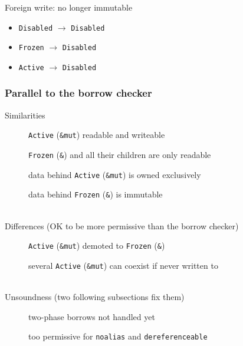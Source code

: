 \begin{frame}[t]
\begin{onlyenv}
        \begin{block}{Foreign write: no longer immutable}
            \begin{itemize}
                \item \texttt{Disabled} \(\to\) \texttt{Disabled}
                \item \texttt{Frozen} \(\to\) \texttt{Disabled}
                \item \texttt{Active} \(\to\) \texttt{Disabled}
            \end{itemize}
        \end{block}
    \end{onlyenv}
\end{frame}

\begin{frame}
    \frametitle{Parallel to the borrow checker}
    Similarities
    \hspace{-5em}
    \begin{description}
        \item[\cmark] \texttt{Active} (\texttt{\&mut}) readable and writeable
        \item[\cmark] \texttt{Frozen} (\texttt{\&}) and all their children are only readable
        \item[\cmark] data behind \texttt{Active} (\texttt{\&mut}) is owned exclusively
        \item[\cmark] data behind \texttt{Frozen} (\texttt{\&}) is immutable
    \end{description}~\\

    Differences (OK to be more permissive than the borrow checker)
    \hspace{-5em}
    \begin{description}
        \item[\xmark] \texttt{Active} (\texttt{\&mut}) demoted to \texttt{Frozen} (\texttt{\&})
        \item[\xmark] several \texttt{Active} (\texttt{\&mut}) can coexist if never written to
    \end{description}~\\

    Unsoundness (two following subsections fix them)
    \hspace{-5em}
    \begin{description}
        \item[\xmark] two-phase borrows not handled yet
        \item[\xmark] too permissive for \texttt{noalias} and \texttt{dereferenceable}
    \end{description}~\\

\end{frame}


